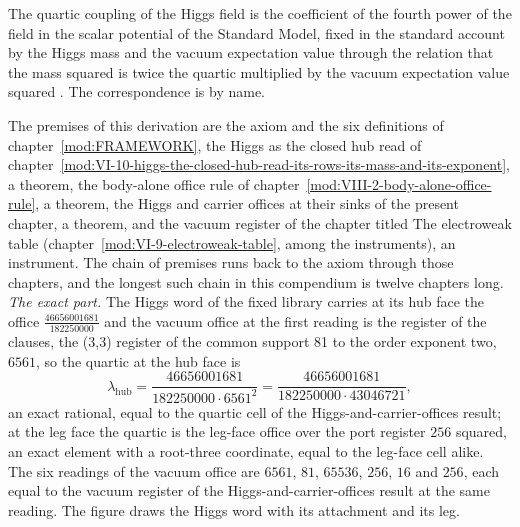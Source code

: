 \begin{chbridge}
The quartic coupling of the Higgs field is the coefficient of the fourth power of the field in the scalar potential of the Standard Model, fixed in the standard account by the Higgs mass and the vacuum expectation value through the relation that the mass squared is twice the quartic multiplied by the vacuum expectation value squared \cite{Weinberg1967,Peskin1995}. The correspondence is by name.
\end{chbridge}
\begin{chproof}
The premises of this derivation are the axiom and the six definitions of chapter~\ref{mod:FRAMEWORK}, the Higgs as the closed hub read of chapter~\ref{mod:VI-10-higgs-the-closed-hub-read-its-rows-its-mass-and-its-exponent}, a theorem, the body-alone office rule of chapter~\ref{mod:VIII-2-body-alone-office-rule}, a theorem, the Higgs and carrier offices at their sinks of the present chapter, a theorem, and the vacuum register of the chapter titled The electroweak table (chapter~\ref{mod:VI-9-electroweak-table}, among the instruments), an instrument. The chain of premises runs back to the axiom through those chapters, and the longest such chain in this compendium is twelve chapters long.
\textit{The exact part.} The Higgs word of the fixed library carries at its hub face the office $\tfrac{46656001681}{182250000}$ and the vacuum office at the first reading is the register of the clauses, the (3,3) register of the common support 81 to the order exponent two, $6561$, so the quartic at the hub face is
\begin{equation} \lambda_{\mathrm{hub}} = \frac{46656001681}{182250000\cdot 6561^{2}} = \frac{46656001681}{182250000\cdot 43046721}, \end{equation}
an exact rational, equal to the quartic cell of the Higgs-and-carrier-offices result; at the leg face the quartic is the leg-face office over the port register $256$ squared, an exact element with a root-three coordinate, equal to the leg-face cell alike. The six readings of the vacuum office are $6561$, $81$, $65536$, $256$, $16$ and $256$, each equal to the vacuum register of the Higgs-and-carrier-offices result at the same reading. The figure draws the Higgs word with its attachment and its leg.

\end{chproof}
